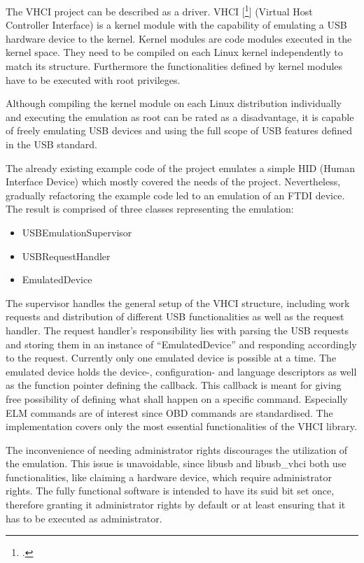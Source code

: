 The VHCI project can be described as a driver. VHCI [\footcite{VHCI}] (Virtual Host Controller Interface) is a kernel module with the capability of emulating a 
USB hardware device to the kernel. Kernel modules are code modules executed in the kernel space. They need to be compiled on each Linux kernel 
independently to match its structure. Furthermore the functionalities defined by kernel modules have to be executed with root privileges.

Although compiling the kernel module on each Linux distribution individually and executing the emulation as root can be rated as a disadvantage,
it is capable of freely emulating USB devices and using the full scope of USB features defined in the USB standard. 

The already existing example code of the project emulates a simple HID (Human Interface Device) which mostly covered the needs of the project. 
Nevertheless, gradually refactoring the example code led to an emulation of an FTDI device. The result is comprised of three classes 
representing the emulation:

\begin{itemize}
 \item USBEmulationSupervisor
 \item USBRequestHandler
 \item EmulatedDevice
\end{itemize}

The supervisor handles the general setup of the VHCI structure, including work requests and distribution of different USB functionalities as 
well as the request handler. The request handler’s responsibility lies with parsing the USB requests and storing them in an instance of 
“EmulatedDevice” and responding accordingly to the request. Currently only one emulated device is possible at a time. The emulated device holds 
the device-, configuration- and language descriptors as well as the function pointer defining the callback. This callback is meant for giving 
free possibility of defining what shall happen on a specific command. Especially ELM commands are of interest since OBD commands are 
standardised. The implementation covers only the most essential functionalities of the VHCI library.

The inconvenience of needing administrator rights discourages the utilization of the emulation. This issue is unavoidable, since libusb and 
libusb\_vhci both use functionalities, like claiming a hardware device, which require administrator rights. The fully functional software is 
intended to have its suid bit set once, therefore granting it administrator rights by default or at least ensuring that it has to be executed 
as administrator.

